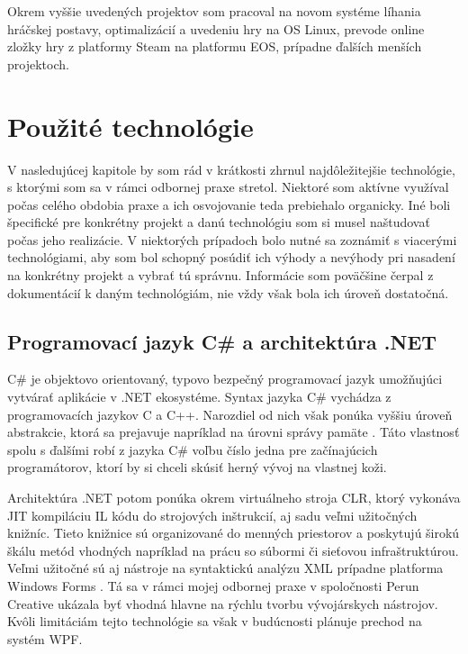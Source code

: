 \documentclass[slovak, bachelorpractice]{diploma}
\begin{document}
Okrem vyššie uvedených projektov som pracoval na novom systéme líhania hráčskej postavy, optimalizácií a uvedeniu hry na OS Linux, prevode online zložky hry z platformy Steam na platformu EOS, prípadne ďalších menších projektoch.

\chapter{Použité technológie}
\label{sec:Tech}
V nasledujúcej kapitole by som rád v krátkosti zhrnul najdôležitejšie technológie, s ktorými som sa v rámci odbornej praxe stretol. Niektoré som aktívne využíval počas celého obdobia praxe a ich osvojovanie teda prebiehalo organicky. Iné boli špecifické pre konkrétny projekt a danú technológiu som si musel naštudovať počas jeho realizácie. V niektorých prípadoch bolo nutné sa zoznámiť s viacerými technológiami, aby som bol schopný posúdiť ich výhody a nevýhody pri nasadení na konkrétny projekt a vybrať tú správnu. Informácie som poväčšine čerpal z dokumentácií k daným technológiám, nie vždy však bola ich úroveň dostatočná.

\section{Programovací jazyk C\# a architektúra .NET}
\label{sec:CsharpDotNet}
C\# je objektovo orientovaný, typovo bezpečný programovací jazyk umožňujúci vytvárať aplikácie v .NET ekosystéme. Syntax jazyka C\# vychádza z programovacích jazykov C a C++. Narozdiel od nich však ponúka vyššiu úroveň abstrakcie, ktorá sa prejavuje napríklad na úrovni správy pamäte \cite{CSharpLang}. Táto vlastnosť spolu s ďalšími robí z jazyka C\#  voľbu číslo jedna pre začínajúcich programátorov, ktorí by si chceli skúsiť herný vývoj na vlastnej koži.

Architektúra .NET potom ponúka okrem virtuálneho stroja CLR, ktorý vykonáva JIT kompiláciu IL kódu do strojových inštrukcií, aj sadu veľmi užitočných knižníc. Tieto knižnice sú organizované do menných priestorov a poskytujú širokú škálu metód vhodných napríklad na prácu so súbormi či sieťovou infraštruktúrou. Veľmi užitočné sú aj nástroje na syntaktickú analýzu XML prípadne platforma Windows Forms \cite{CSharpLang}. Tá sa v rámci mojej odbornej praxe v spoločnosti Perun Creative ukázala byť vhodná hlavne na rýchlu tvorbu vývojárskych nástrojov. Kvôli limitáciám tejto technológie sa však v budúcnosti plánuje prechod na systém WPF.
\end{document}
